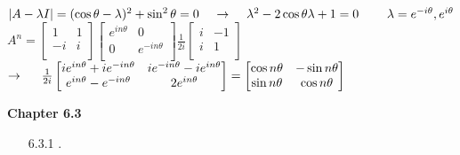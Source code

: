 \documentclass[10pt,twoside,reqno]{article}
\begin{document}
\begin{enumerate}
\begin{center}
$
|A-\lambda I| = (\cos\theta-\lambda)^2+\sin^2\theta=0
\hspace{4mm} \rightarrow \hspace{4mm}
\lambda^2-2\cos\theta\lambda+1=0 \hspace{8mm} \lambda=e^{-i\theta},e^{i\theta}
$ \\
$
A^n=
\begin{bmatrix}
1&1\\
-i&i\\
\end{bmatrix}
\begin{bmatrix}
e^{in\theta}&0\\
0&e^{-in\theta}\\
\end{bmatrix}
\frac{1}{2i}
\begin{bmatrix}
i&-1\\
i&1\\
\end{bmatrix}
$ \\
$
\rightarrow
\hspace{5mm}
\frac{1}{2i}
\begin{bmatrix}
ie^{in\theta}+ie^{-in\theta}&ie^{-in\theta}-ie^{in\theta}\\
e^{in\theta}-e^{-in\theta}&2e^{in\theta}\\
\end{bmatrix}
=
\begin{bmatrix}
\cos n\theta&-\sin n\theta\\
\sin n\theta&\cos n\theta\\
\end{bmatrix}
$ \\
\end{center}

\vspace{3mm}
\end{enumerate}
\vspace{5mm}
\textbf{Chapter 6.3}
\begin{enumerate}
\item[6.3.1]  .\\ \vspace{2mm}


\vspace{3mm}
\end{enumerate}
\end{document}
